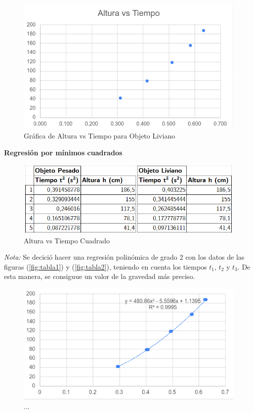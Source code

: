 \begin{multicols}{2}
        \begin{figure}[H]
            \centering
            \includegraphics[scale=0.5]{fig/objLiviano-Altura-Tiempo.png}
            \caption{Gráfica de Altura vs Tiempo para Objeto Liviano}
        \end{figure}

\textbf{Regresión por mínimos cuadrados}
\begin{figure}[H]
    \centering
    \includegraphics[scale=0.5]{fig/Tabla3-TiempoCuadrado.png}
    \caption[scale=0.5]{Altura vs Tiempo Cuadrado}
\end{figure}

\textit{Nota: } Se decició hacer una regresión polinómica de grado 2 con los datos de las figuras (\ref{fig:tabla1}) y (\ref{fig:tabla2}), teniendo en cuenta los tiempos $t_1$, $t_2$ y $t_3$. De esta manera, se consiguue un valor de la gravedad más preciso.
\begin{figure}[H]
    \centering
    \includegraphics[scale=0.5]{fig/regresion-ObjetoPesado.png}
    \caption{...}
\end{figure}


\end{multicols}
